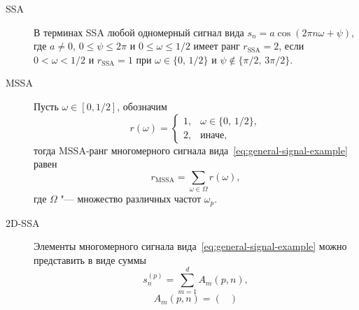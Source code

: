 \documentclass[specialist,
    substylefile = spbu_report.rtx,
    subf,href,colorlinks=true, 12pt]{disser}
\theoremstyle{plain}
\theoremstyle{definition}
\theoremstyle{remark}
\begin{document}
    \begin{description}
        \item[SSA] В терминах SSA любой одномерный сигнал вида $s_n = a \cos(2\pi n \omega + \psi)$, где $a\ne 0$,
        $0 \leqslant \psi \leqslant 2\pi$ и $0 \leqslant \omega \leqslant 1/2$ имеет ранг
        $r_\text{SSA} = 2$, если $0 < \omega < 1/2$ и $r_\text{SSA} = 1$ при $\omega \in \{0,\, 1/2\}$ и
        $\psi \notin \{\pi / 2,\, 3\pi / 2\}$.
        \item[MSSA] Пусть $\omega \in [0, 1/2]$, обозначим
        \[
            r(\omega) =
            \begin{cases}
                1, & \omega \in \{0,\, 1/2\},\\
                2, & \text{иначе},
            \end{cases}
        \]
        тогда MSSA-ранг многомерного сигнала вида~\eqref{eq:general-signal-example} равен
        \[
            r_{\text{MSSA}} = \sum_{\omega \in \Omega} r(\omega),
        \]
        где $\Omega$ "--- множество различных частот $\omega_p$.
        \item[2D-SSA] Элементы многомерного сигнала вида~\eqref{eq:general-signal-example} можно
        представить в виде суммы
        \[
            s^{(p)}_n = \sum_{m=1}^{d} A_m(p, n),
        \]
        \[
            A_m(p, n) =
            \begin{pmatrix}

\end{pmatrix}\]
\end{description}
\end{document}
